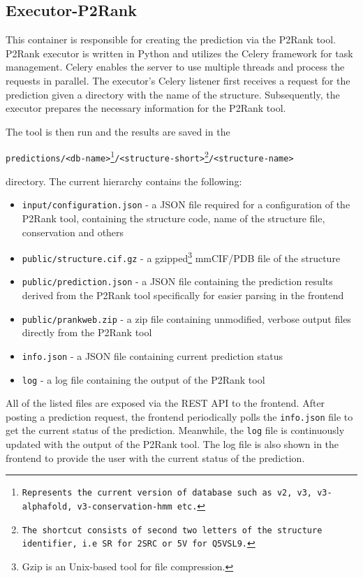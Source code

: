 \subsection{Executor-P2Rank}
\label{subsec:executor-p2rank}

This container is responsible for creating the prediction via the P2Rank tool. P2Rank executor is written in Python and utilizes the Celery framework for task management. Celery enables the server to use multiple threads and process the requests in parallel. The executor's Celery listener first receives a request for the prediction given a directory with the name of the structure. Subsequently, the executor prepares the necessary information for the P2Rank tool.

The tool is then run and the results are saved in the

\texttt{predictions/<db-name>\footnote{Represents the current version of database such as v2, v3, v3-alphafold, v3-conservation-hmm etc.}/<structure-short>\footnote{The shortcut consists of second two letters of the structure identifier, i.e \texttt{SR} for \texttt{2SRC} or \texttt{5V} for \texttt{Q5VSL9}.}/<structure-name>} 

directory. The current hierarchy contains the following:
\begin{itemize}
    \item \texttt{input/configuration.json} - a JSON file required for a configuration of the P2Rank tool, containing the structure code, name of the structure file, conservation and others
    \item \texttt{public/structure.cif.gz} - a gzipped\footnote{Gzip is an Unix-based tool for file compression.} mmCIF/PDB file of the structure
    \item \texttt{public/prediction.json} - a JSON file containing the prediction results derived from the P2Rank tool specifically for easier parsing in the frontend
    \item \texttt{public/prankweb.zip} - a zip file containing unmodified, verbose output files directly from the P2Rank tool
    \item \texttt{info.json} - a JSON file containing current prediction status
    \item \texttt{log} - a log file containing the output of the P2Rank tool
\end{itemize}

All of the listed files are exposed via the REST API to the frontend. After posting a prediction request, the frontend periodically polls the \texttt{info.json} file to get the current status of the prediction. Meanwhile, the \texttt{log} file is continuously updated with the output of the P2Rank tool. The log file is also shown in the frontend to provide the user with the current status of the prediction.

